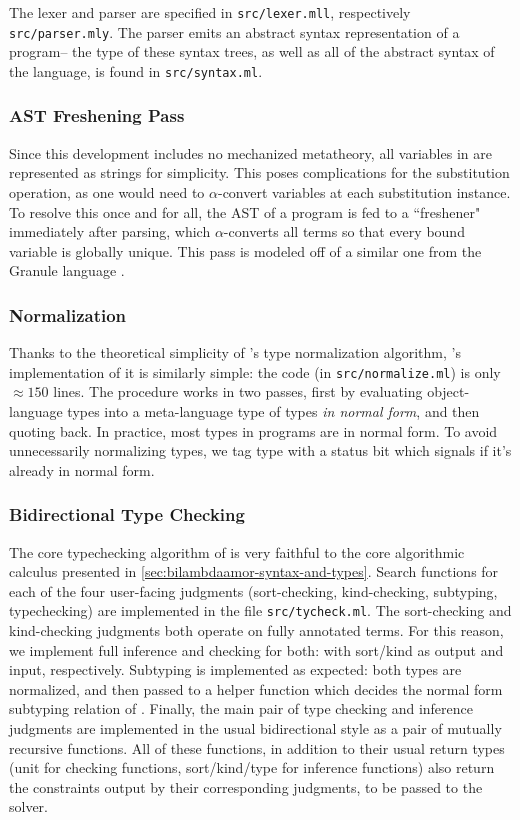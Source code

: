 The lexer and parser are specified in \texttt{src/lexer.mll}, respectively \texttt{src/parser.mly}. The parser emits an abstract syntax representation of a program-- the type of these syntax trees, as well as all of the abstract syntax of the language, is found in \texttt{src/syntax.ml}.


\subsubsection{AST Freshening Pass}
Since this development includes no mechanized metatheory, all variables in \lambdaamorimpl are represented as strings for simplicity. This poses complications for the substitution operation, as one would need to $\alpha$-convert variables at each substitution instance. To resolve this once and for all, the AST of a program is fed to a ``freshener" immediately after parsing, which $\alpha$-converts all terms so that every bound variable is globally unique. This pass is modeled off of a similar one from the Granule language \cite{orchard-et-al:popl19}.

\subsubsection{Normalization}
Thanks to the theoretical simplicity of \lambdaamor's type normalization algorithm, \lambdaamorimpl's implementation of it is similarly simple: the code (in \texttt{src/normalize.ml}) is only $\approx 150$ lines. The procedure works in two passes, first by evaluating object-language types into a meta-language type of types \textit{in normal form}, and then quoting back. In practice, most types in \lambdaamor programs are in normal form. To avoid unnecessarily normalizing types, we tag type with a status bit which signals if it's already in normal form.

\subsubsection{Bidirectional Type Checking}
The core typechecking algorithm of \lambdaamorimpl is very faithful to the core algorithmic calculus presented in \autoref{sec:bilambdaamor-syntax-and-types}. Search functions for each of the four user-facing judgments (sort-checking, kind-checking, subtyping, typechecking) are implemented in the file \texttt{src/tycheck.ml}. The sort-checking and kind-checking judgments both operate on fully annotated terms. For this reason, we implement full inference and checking for both: with sort/kind as output and input, respectively. Subtyping is implemented as expected: both types are normalized, and then passed to a helper function which decides the normal form subtyping relation of \bilambdaamor. Finally, the main pair of type checking and inference judgments are implemented in the usual bidirectional style as a pair of mutually recursive functions. All of these functions, in addition to their usual return types (unit for checking functions, sort/kind/type for inference functions) also return the constraints output by their corresponding judgments, to be passed to the solver.

